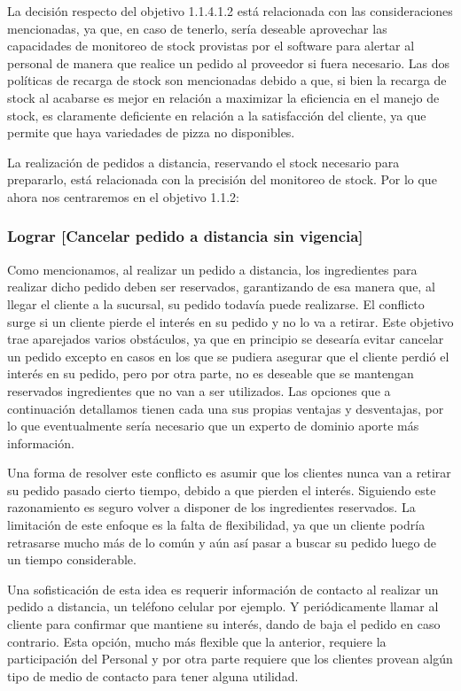 \documentclass[a4paper,10pt]{article}
\begin{document}
La decisión respecto del objetivo 1.1.4.1.2 está relacionada con las consideraciones mencionadas, ya que, en caso de tenerlo, sería deseable aprovechar las capacidades de monitoreo de stock provistas por el software para alertar al personal de manera que realice un pedido al proveedor si fuera necesario. Las dos políticas de recarga de stock son mencionadas debido a que, si bien la recarga de stock al acabarse es mejor en relación a maximizar la eficiencia en el manejo de stock, es claramente deficiente en relación a la satisfacción del cliente, ya que permite que haya variedades de pizza no disponibles.


La realización de pedidos a distancia, reservando el stock necesario para prepararlo, está relacionada con la precisión del monitoreo de stock. Por lo que ahora nos centraremos en el objetivo 1.1.2:
\subsubsection*{Lograr [Cancelar pedido a distancia sin vigencia]}
Como mencionamos, al realizar un pedido a distancia, los ingredientes para realizar dicho pedido deben ser reservados, garantizando de esa manera que, al llegar el cliente a la sucursal, su pedido todavía puede realizarse. El conflicto surge si un cliente pierde el interés en su pedido y no lo va a retirar.
Este objetivo trae aparejados varios obstáculos, ya que en principio se desearía evitar cancelar un pedido excepto en casos en los que se pudiera asegurar que el cliente perdió el interés en su pedido, pero por otra parte, no es deseable que se mantengan reservados ingredientes que no van a ser utilizados.
Las opciones que a continuación detallamos tienen cada una sus propias ventajas y desventajas, por lo que eventualmente sería necesario que un experto de dominio aporte más información.


Una forma de resolver este conflicto es asumir que los clientes nunca van a retirar su pedido pasado cierto tiempo, debido a que pierden el interés. Siguiendo este razonamiento es seguro volver a disponer de los ingredientes reservados. La limitación de este enfoque es la falta de flexibilidad, ya que un cliente podría retrasarse mucho más de lo común y aún así pasar a buscar su pedido luego de un tiempo considerable.

Una sofisticación de esta idea es requerir información de contacto al realizar un pedido a distancia, un teléfono celular por ejemplo. Y periódicamente llamar al cliente para confirmar que mantiene su interés, dando de baja el pedido en caso contrario. Esta opción, mucho más flexible que la anterior, requiere la participación del Personal y por otra parte requiere que los clientes provean algún tipo de medio de contacto para tener alguna utilidad.
\end{document}
